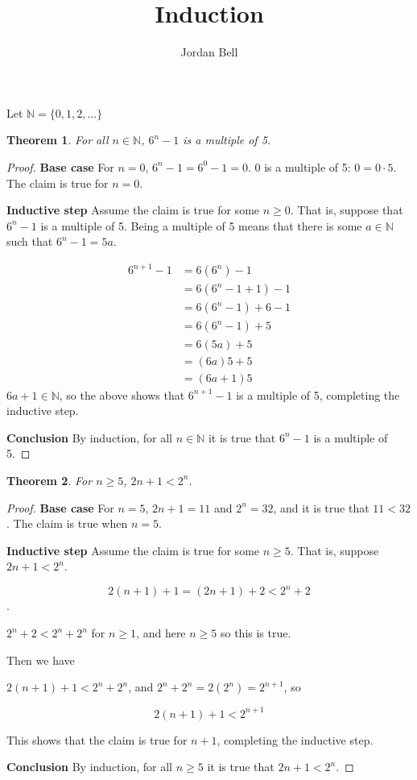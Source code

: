 \documentclass[11pt]{article} %
\title{Induction}
\author{Jordan Bell}
\newtheorem{theorem}{Theorem}
\begin{document}
\maketitle

Let $\mathbb{N} = \{0,1,2,\ldots\}$

\begin{theorem}
For all $n \in \mathbb{N}$, $6^n-1$ is a multiple of 5.
\end{theorem}
\begin{proof}
\textbf{Base case} For $n=0$, $6^n-1=6^0-1=0$. $0$ is a multiple of 5: $0 = 0\cdot 5$. The claim is true for $n=0$.

\textbf{Inductive step} Assume the claim is true for some $n \geq 0$. That is, suppose that $6^n-1$ is a multiple of 5. Being a multiple of 5 means that
there is some $a \in \mathbb{N}$ such that $6^n-1=5a$.

\begin{align*}
6^{n+1}-1&=6(6^n)-1\\
&=6(6^n-1+1)-1\\
&=6(6^n-1) + 6 - 1\\
&=6(6^n-1) + 5\\
&=6(5a) + 5\\
&=(6a)5+5\\
&=(6a+1)5
\end{align*}
$6a+1 \in \mathbb{N}$, so the above shows that $6^{n+1}-1$ is a multiple of 5, completing the inductive step.

\textbf{Conclusion} By induction, for all $n \in \mathbb{N}$ it is true that $6^n-1$ is a multiple of 5.
\end{proof}

\newpage

\begin{theorem}
For $n \geq 5$, $2n+1 < 2^n$.
\end{theorem}
\begin{proof}
\textbf{Base case} For $n=5$, $2n+1 = 11$ and $2^n=32$, and it is true that $11<32$. The claim is true when $n=5$.

\textbf{Inductive step} Assume the claim is true for some $n \geq 5$. That is, suppose $2n+1 < 2^n$.

$$2(n+1) + 1 = (2n+1)+2< 2^n + 2$$.

$2^n+2 < 2^n+2^n$ for $n \geq 1$, and here $n \geq 5$ so this is true.

Then we have

$2(n+1)+1 < 2^n + 2^n$, and $2^n+2^n = 2(2^n) = 2^{n+1}$, so

$$2(n+1)+1 < 2^{n+1}$$

This shows that the claim is true for $n+1$, completing the inductive step.

\textbf{Conclusion}  By induction, for all $n \geq 5$ it is true that $2n+1 < 2^n$.
\end{proof}
\end{document}
